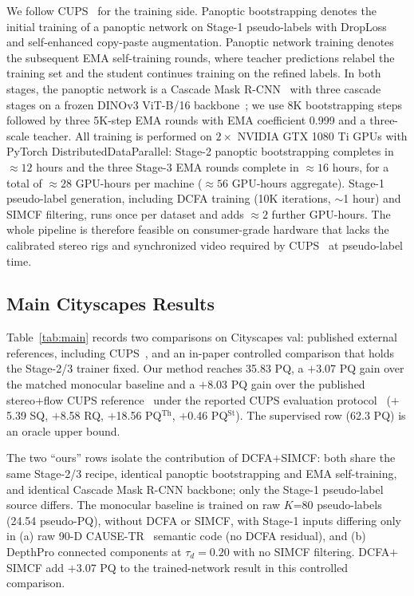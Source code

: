 \documentclass[10pt,twocolumn,letterpaper]{article}
\begin{document}
We follow CUPS~\cite{hahn2025cups} for the training side. Panoptic bootstrapping denotes the initial training of a panoptic network on Stage-1 pseudo-labels with DropLoss~\cite{wang2023cutler} and self-enhanced copy-paste augmentation. Panoptic network training denotes the subsequent EMA self-training rounds, where teacher predictions relabel the training set and the student continues training on the refined labels. In both stages, the panoptic network is a Cascade Mask R-CNN~\cite{cai2018cascade} with three cascade stages on a frozen DINOv3 ViT-B/16 backbone~\cite{simeoni2025dinov3}; we use 8K bootstrapping steps followed by three 5K-step EMA rounds with EMA coefficient 0.999 and a three-scale teacher. All training is performed on $2 \times$ NVIDIA GTX 1080 Ti GPUs with PyTorch DistributedDataParallel: Stage-2 panoptic bootstrapping completes in $\approx 12$ hours and the three Stage-3 EMA rounds complete in $\approx 16$ hours, for a total of $\approx 28$ GPU-hours per machine ($\approx 56$ GPU-hours aggregate). Stage-1 pseudo-label generation, including DCFA training (10K iterations, $\sim$1 hour) and SIMCF filtering, runs once per dataset and adds $\approx 2$ further GPU-hours. The whole pipeline is therefore feasible on consumer-grade hardware that lacks the calibrated stereo rigs and synchronized video required by CUPS~\cite{hahn2025cups} at pseudo-label time.


\subsection{Main Cityscapes Results}
\label{sec:exp:main}

Table~\ref{tab:main} records two comparisons on Cityscapes val: published external references, including CUPS~\cite{hahn2025cups}, and an in-paper controlled comparison that holds the Stage-2/3 trainer fixed. Our method reaches 35.83 PQ, a $+$3.07 PQ gain over the matched monocular baseline and a $+$8.03 PQ gain over the published stereo+flow CUPS reference~\cite{hahn2025cups} under the reported CUPS evaluation protocol~\cite{hahn2025cups} ($+$5.39 SQ, $+$8.58 RQ, $+$18.56 PQ$^\text{Th}$, $+$0.46 PQ$^\text{St}$). The supervised row (62.3 PQ) is an oracle upper bound.

The two ``ours'' rows isolate the contribution of DCFA$+$SIMCF: both share the same Stage-2/3 recipe, identical panoptic bootstrapping and EMA self-training, and identical Cascade Mask R-CNN backbone; only the Stage-1 pseudo-label source differs. The monocular baseline is trained on raw $K$=80 pseudo-labels (24.54 pseudo-PQ), without DCFA or SIMCF, with Stage-1 inputs differing only in (a) raw 90-D CAUSE-TR~\cite{kim2024cause} semantic code (no DCFA residual), and (b) DepthPro connected components at $\tau_d = 0.20$ with no SIMCF filtering. DCFA$+$SIMCF add $+$3.07 PQ to the trained-network result in this controlled comparison.
\end{document}
